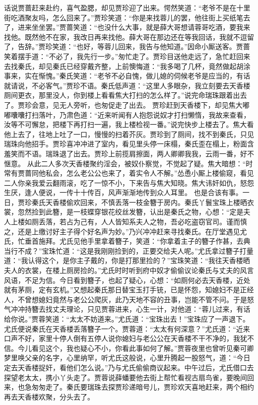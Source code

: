 \documentclass[12pt,oneside]{book}
\begin{document}
话说贾蔷赶来赴约，喜气盈腮，却见贾珍迎了出来。愕然笑道：“老爷不是在十里街吃酒聚友吗，怎么回来了。”贾珍笑道：“你是来找蓉儿的罢，他往街上买纸笔去了，进来坐坐罢。”贾蔷笑道：“也没什么大事，就是薛大哥想请蓉哥吃酒，要我来找他。既然他不在家，我改日再来找他。薛大哥在那边还在等我回话，我就不逗留了，告辞。”贾珍笑道：“也好，等蓉儿回来，我告与他知道。”因命小厮送客。贾蔷笑着摆手道：“不必了，我先行一步。”匆忙走了。贾珍目送他走远了，急忙赶回来去找秦氏，却见秦氏已经穿戴齐整，上前懊悔道：“我多喝了几杯，竟然做起胡涂事来，实在惭愧。”秦氏笑道：“老爷不必自愧，做儿媳的伺候老爷是应当的，有话就请说，不必客气。”贾珍不语。秦氏低声道：“这里人多眼杂，我立刻要去天香楼厕间更衣，那里没人，你到楼上看看焦大打扫的怎么样了。”说完命瑞珠跟着出去了。贾珍会意，见无人旁听，也匆促走了出去。
贾珍赶到天香楼下，却见焦大嘟嘟囔囔打扫落叶，乃肃色道：“近来听闻有人抱怨说奴才打扫懒惰，我故来查看，汝等不可懈怠，把楼下再打扫一遍，我上楼检视一番。”说完快步上楼去了。焦大看他上去了，往地上吐了一口，慢慢的扫着芥灰。贾珍到了厕间，找不到秦氏，只见瑞珠向他招手。贾珍喜冲冲进了室内，看见里头停一床榻，秦氏歪在榻上，粉面含羞笑而不语。瑞珠退了出去。贾珍上前揽肩擦面，两人卿卿我我，云雨一番，好不惬意。   
从此二人多次天香楼聚约淫会，被奴仆察觉，不觉起了疑。焦大暗想：“时常有贾蔷同他私会，怎么老公公也来了，着实令人不解。”怂恿小厮上楼偷窥，看见二人你亲我爱云翻雨滚，吃了一惊不小，下来告与焦大知晓。焦大讳奸如仇，怒怨生厌，逢人便说，一传十十传百，风声渐渐地传到众人耳里。
也是合该有事。一日，贾珍秦氏天香楼偷欢回来，不慎丢落一枝金簪于房内。秦氏丫鬟宝珠上楼晒衣裳，忽然捡到此簪，是一枝蝶穿银花绞丝发簪，认出是秦氏之物，心想：“定是夫人上楼如厕丢落，若占为己有，人人皆知系夫人之物，吾必吃盗窃官司。谨而慎之，还是上缴讨好主子得个好名声为妙。”乃兴冲冲赶来寻找秦氏。在厅堂遇见尤氏，忙垂首施拜。尤氏见他手里拿着簪子，笑道：“你拿着主子的簪子作甚，去典当行不成？”宝珠忙道：“这是我刚刚捡到的，正要交给夫人呢。”尤氏拿过簪子打量道：“我认得这个，是你主子戴的，你是打那里捡的？”宝珠笑道：“我往天香楼晒夫人的衣裳，在楼上厕房捡的。”尤氏时时听到府中奴才偷偷议论秦氏与丈夫的风言风语，不足为信。今日看到簪子，也起了疑心，心想：“如厕何必去天香楼，近处就有茅厕，定有玄机。”又想起秦氏那日替宝玉打手铳，已是怀怨，知媳妇不是正经人，不曾想媳妇竟然与老公公爬灰，此乃天地不容的丑事，岂能不管不问。于是怒气冲冲持簪去找丈夫理论，只见贾蓉进来，心生一计，对他道：“蓉儿过来，有话给你说。”贾蓉笑道：“太太不妨道来。”尤氏道：“宝珠出去！”宝珠应了一声退下。尤氏便说秦氏在天香楼丢落簪子一个。贾蓉道：“太太有何深意？”尤氏道：“近来口声不好，家里十停人倒有五停人说你媳妇与老公公在天香楼不干不净的，我犹不信。今儿看见这个，我也疑心不小，你看此事如何了解。”贾蓉夜里也曾听见秦可卿梦里唤父亲的名字，心里纳罕，听尤氏这般说，心里升腾起一股怒气，道：“今日定去天香楼捉奸，看他们怎么说。”乃与尤氏偷偷商议起来。中午过后，尤氏借口去探望老太太，携小丫头走了。贾蓉说薛蟠要他去街上帮忙看视古扇鸟雀，要晚间回来，也急匆匆走了。秦氏要瑞珠去探贾珍递暗号儿，贾珍欢天喜地赶来，两个相约再去天香楼欢聚，分头去了。
\end{document}
